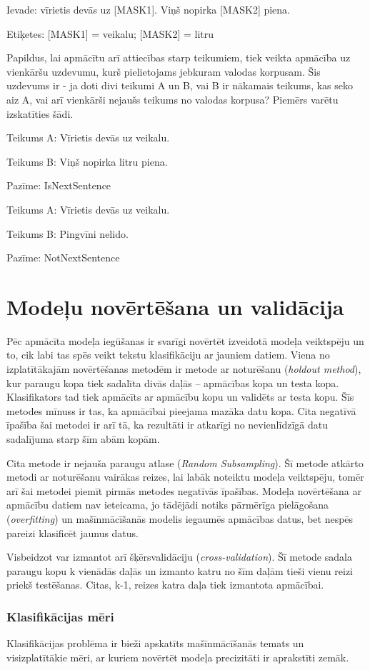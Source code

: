 Ievade: vīrietis devās uz [MASK1]. Viņš nopirka [MASK2] piena.

Etiķetes: [MASK1] = veikalu; [MASK2] = litru

Papildus, lai apmācītu arī attiecības starp teikumiem, tiek veikta apmācība uz vienkāršu uzdevumu, kurš pielietojams jebkuram valodas korpusam. Šis uzdevums ir - ja doti divi teikumi A un B, vai B ir nākamais teikums, kas seko aiz A, vai arī vienkārši nejaušs teikums no valodas korpusa? Piemērs varētu izskatīties šādi.

Teikums A: Vīrietis devās uz veikalu.

Teikums B: Viņš nopirka litru piena.

Pazīme: IsNextSentence

Teikums A: Vīrietis devās uz veikalu.

Teikums B: Pingvīni nelido.

Pazīme: NotNextSentence

\section{Modeļu novērtēšana un validācija}
Pēc apmācīta modeļa iegūšanas ir svarīgi novērtēt izveidotā modeļa veiktspēju un to, cik labi tas spēs veikt tekstu klasifikāciju ar jauniem datiem. 
Viena no izplatītākajām novērtēšanas metodēm ir metode ar noturēšanu (\textit{holdout method}), kur paraugu kopa tiek sadalīta divās daļās – apmācības kopa un testa kopa. Klasifikators tad tiek apmācīts ar apmācību kopu un validēts ar testa kopu. Šīs metodes mīnuss ir tas, ka apmācībai pieejama mazāka datu kopa. Cita negatīvā īpašība šai metodei ir arī tā, ka rezultāti ir atkarīgi no nevienlīdzīgā datu sadalījuma starp šīm abām kopām.

Cita metode ir nejauša paraugu atlase (\textit{Random Subsampling}). Šī metode atkārto metodi ar noturēšanu vairākas reizes, lai labāk noteiktu modeļa veiktspēju, tomēr arī šai metodei piemīt pirmās metodes negatīvās īpašības.
Modeļa novērtēšana ar apmācību datiem nav ieteicama, jo tādējādi notiks pārmērīga pielāgošana (\textit{overfitting}) un mašīnmācīšanās modelis iegaumēs apmācības datus, bet nespēs pareizi klasificēt jaunus datus.

Visbeidzot var izmantot arī šķērsvalidāciju (\textit{cross-validation}). Šī metode sadala paraugu kopu k vienādās daļās un izmanto katru no šīm daļām tieši vienu reizi priekš testēšanas.  Citas, k-1, reizes katra daļa tiek izmantota apmācībai.

\subsubsection{Klasifikācijas mēri}
\renewcommand{\theequation}{2.\arabic{equation}}
Klasifikācijas problēma ir bieži apskatīts mašīnmācīšanās temats un visizplatītākie mēri, ar kuriem novērtēt modeļa precizitāti ir aprakstīti zemāk.

